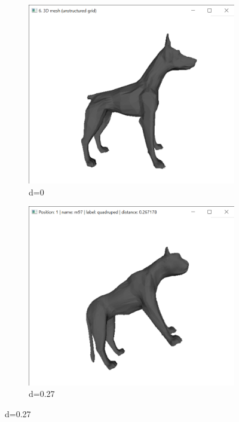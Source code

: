 \documentclass{bigdata}
\begin{document}
\begin{figure}[h!]
  \centering
  \begin{subfigure}[b]{0.09\linewidth}
    \includegraphics[width=\linewidth]{Pictures/Evaluation/m92/m92.png}
    \caption*{d=0}
  \end{subfigure}
  \begin{subfigure}[b]{0.09\linewidth}
    \includegraphics[width=\linewidth]{Pictures/Evaluation/m92/pos1.png}
    \caption*{d=0.27}

\end{subfigure}
\end{figure}
\end{document}
